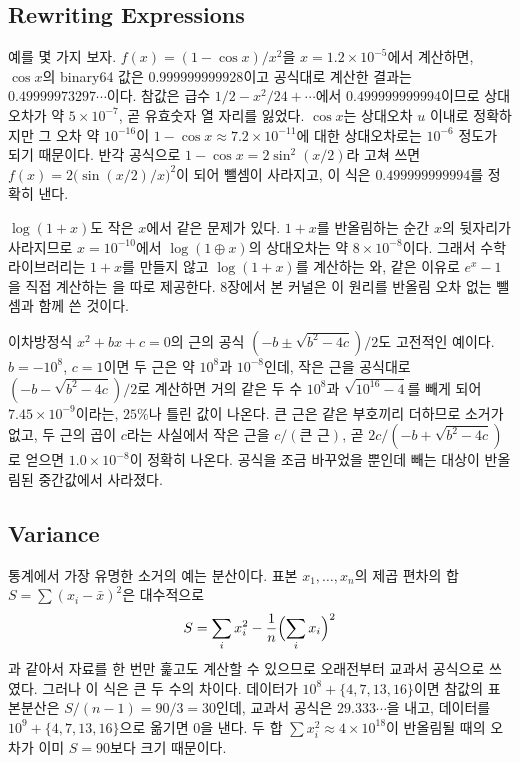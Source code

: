 \subsection{Rewriting Expressions}

예를 몇 가지 보자. $f(x)=(1-\cos x)/x^2$을 $x=1.2\times10^{-5}$에서 계산하면, $\cos x$의 binary64 값은 $0.999999999928$이고 공식대로 계산한 결과는 $0.49999973297\cdots$이다. 참값은 급수 $1/2-x^2/24+\cdots$에서 $0.499999999994$이므로 상대오차가 약 $5\times10^{-7}$, 곧 유효숫자 열 자리를 잃었다. $\cos x$는 상대오차 $u$ 이내로 정확하지만 그 오차 약 $10^{-16}$이 $1-\cos x\approx7.2\times10^{-11}$에 대한 상대오차로는 $10^{-6}$ 정도가 되기 때문이다. 반각 공식으로 $1-\cos x=2\sin^2(x/2)$라 고쳐 쓰면 $f(x)=2\bigl(\sin(x/2)/x\bigr)^2$이 되어 뺄셈이 사라지고, 이 식은 $0.499999999994$를 정확히 낸다.

$\log(1+x)$도 작은 $x$에서 같은 문제가 있다. $1+x$를 반올림하는 순간 $x$의 뒷자리가 사라지므로 $x=10^{-10}$에서 $\log(1\oplus x)$의 상대오차는 약 $8\times10^{-8}$이다. 그래서 수학 라이브러리는 $1+x$를 만들지 않고 $\log(1+x)$를 계산하는 와, 같은 이유로 $e^x-1$을 직접 계산하는 을 따로 제공한다. 8장에서 본  커널은 이 원리를 반올림 오차 없는 뺄셈과 함께 쓴 것이다.

이차방정식 $x^2+bx+c=0$의 근의 공식 $(-b\pm\sqrt{b^2-4c})/2$도 고전적인 예이다. $b=-10^8$, $c=1$이면 두 근은 약 $10^8$과 $10^{-8}$인데, 작은 근을 공식대로 $(-b-\sqrt{b^2-4c})/2$로 계산하면 거의 같은 두 수 $10^8$과 $\sqrt{10^{16}-4}$를 빼게 되어 $7.45\times10^{-9}$이라는, $25\%$나 틀린 값이 나온다. 큰 근은 같은 부호끼리 더하므로 소거가 없고, 두 근의 곱이 $c$라는 사실에서 작은 근을 $c/(\text{큰 근})$, 곧 $2c/(-b+\sqrt{b^2-4c})$로 얻으면 $1.0\times10^{-8}$이 정확히 나온다. 공식을 조금 바꾸었을 뿐인데 빼는 대상이 반올림된 중간값에서 사라졌다.

\subsection{Variance}

통계에서 가장 유명한 소거의 예는 분산이다. 표본 $x_1,\dots,x_n$의 제곱 편차의 합 $S=\sum(x_i-\bar x)^2$은 대수적으로
\[
S=\sum_ix_i^2-\frac1n\Bigl(\sum_ix_i\Bigr)^2
\]
과 같아서 자료를 한 번만 훑고도 계산할 수 있으므로 오래전부터 교과서 공식으로 쓰였다. 그러나 이 식은 큰 두 수의 차이다. 데이터가 $10^8+\{4,7,13,16\}$이면 참값의 표본분산은 $S/(n-1)=90/3=30$인데, 교과서 공식은 $29.333\cdots$을 내고, 데이터를 $10^9+\{4,7,13,16\}$으로 옮기면 $0$을 낸다. 두 합 $\sum x_i^2\approx4\times10^{18}$이 반올림될 때의 오차가 이미 $S=90$보다 크기 때문이다.

